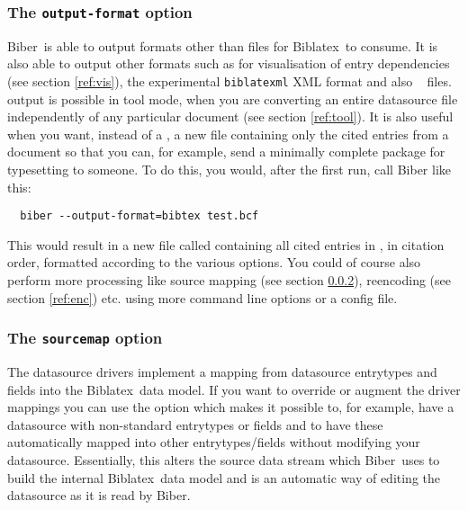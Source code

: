 \documentclass{ltxdockit}
\newcommand*{\biber}{Biber\xspace}
\newcommand*{\biblatex}{Biblatex\xspace}
\begin{document}
\subsubsection{The \texttt{output-format} option}\label{ref:of}

\biber\ is able to output formats other than  files for \biblatex\
to consume. It is also able to output other formats such as  for
visualisation of entry dependencies (see section \ref{ref:vis}), the
experimental \verb+biblatexml+ XML format and also \bibtex\  files.
\file{.bib} output is possible in tool mode, when you are converting an
entire datasource file independently of any particular document (see
section \ref{ref:tool}). It is also useful when you want, instead of a
\file{.bbl}, a new \file{.bib} file containing only the cited entries from
a document so that you can, for example, send a minimally complete package
for typesetting to someone. To do this, you would, after the first \latex
run, call \biber like this:

\begin{verbatim}
  biber --output-format=bibtex test.bcf
\end{verbatim}

\noindent This would result in a new  file called
 containing all cited entries in , in
citation order, formatted according to the various \opt{ouput-*} options.
You could of course also perform more processing like source mapping
(see section \ref{ref:map}), reencoding (see section \ref{ref:enc}) etc. using more
command line options or a config file.

\subsubsection{The \texttt{sourcemap} option}\label{ref:map}

The datasource drivers implement a mapping from datasource
entrytypes and fields into the \biblatex\ data model. If you want to
override or augment the driver mappings you can use the
 option which makes it possible to, for example, have a
datasource with non-standard entrytypes or fields and to have these
automatically mapped into other entrytypes/fields without modifying
your datasource.  Essentially, this alters the source data stream
which \biber\ uses to build the internal \biblatex\ data model and is an
automatic way of editing the datasource as it is read by \biber.
\end{document}
